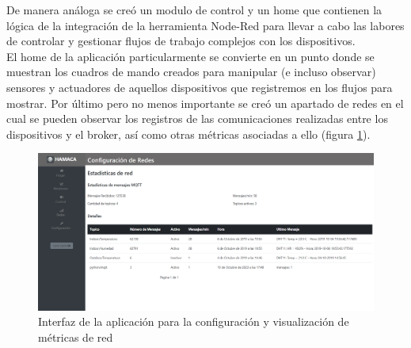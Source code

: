 De manera análoga se creó un modulo de control y un home que contienen la lógica de la integración de la herramienta Node-Red para llevar a cabo las labores de controlar y gestionar flujos de trabajo complejos con los dispositivos.\\


El home de la aplicación particularmente se convierte en un punto donde se muestran los cuadros de mando creados para manipular (e incluso observar) sensores y actuadores de aquellos dispositivos que registremos en los flujos para mostrar. Por último pero no menos importante se creó un apartado de redes en el cual se pueden observar los registros de las comunicaciones realizadas entre los dispositivos y el broker, así como otras métricas asociadas a ello (figura  \ref{fig:hamaca_redes}).\\


\begin{figure}[!htb]
\centering
\includegraphics[scale=0.225]{./Figuras/hamaca_redes.png}
\caption{Interfaz de la aplicación para la configuración y visualización de métricas de red}
\label{fig:hamaca_redes}
\vspace*{-10pt}
\end{figure}


